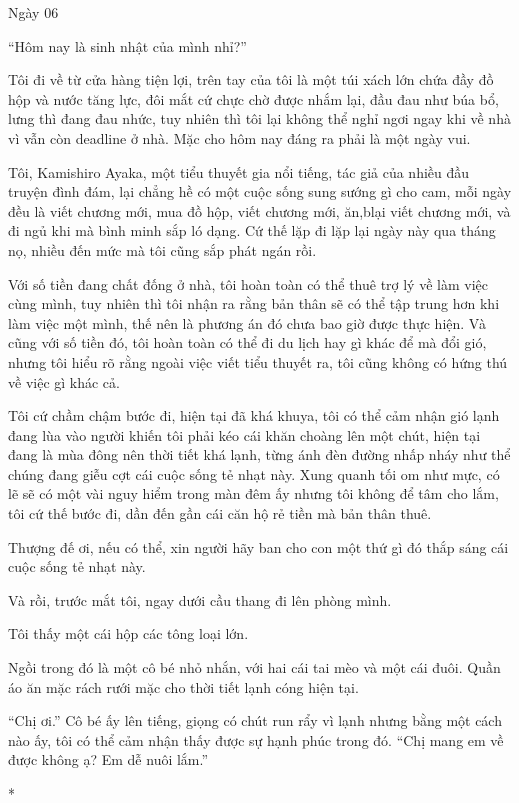 {Ngày 06}
{
``Hôm nay là sinh nhật của mình nhỉ?''

Tôi đi về từ cửa hàng tiện lợi, trên tay của tôi là một túi xách lớn
chứa đầy đồ hộp và nước tăng lực, đôi mắt cứ chực chờ được nhắm lại, đầu
đau như búa bổ, lưng thì đang đau nhức, tuy nhiên thì tôi lại không thể
nghỉ ngơi ngay khi về nhà vì vẫn còn deadline ở nhà. Mặc cho hôm nay
đáng ra phải là một ngày vui.

Tôi, Kamishiro Ayaka, một tiểu thuyết gia nổi tiếng, tác giả của nhiều
đầu truyện đình đám, lại chẳng hề có một cuộc sống sung sướng gì cho
cam, mỗi ngày đều là viết chương mới, mua đồ hộp, viết chương mới,
ăn,blại viết chương mới, và đi ngủ khi mà bình minh sắp ló dạng. Cứ thế
lặp đi lặp lại ngày này qua tháng nọ, nhiều đến mức mà tôi cũng sắp phát
ngán rồi.

Với số tiền đang chất đống ở nhà, tôi hoàn toàn có thể thuê trợ lý về
làm việc cùng mình, tuy nhiên thì tôi nhận ra rằng bản thân sẽ có thể
tập trung hơn khi làm việc một mình, thế nên là phương án đó chưa bao
giờ được thực hiện. Và cũng với số tiền đó, tôi hoàn toàn có thể đi du
lịch hay gì khác để mà đổi gió, nhưng tôi hiểu rõ rằng ngoài việc viết
tiểu thuyết ra, tôi cũng không có hứng thú về việc gì khác cả.

Tôi cứ chầm chậm bước đi, hiện tại đã khá khuya, tôi có thể cảm nhận gió
lạnh đang lùa vào người khiến tôi phải kéo cái khăn choàng lên một chút,
hiện tại đang là mùa đông nên thời tiết khá lạnh, từng ánh đèn đường
nhấp nháy như thể chúng đang giễu cợt cái cuộc sống tẻ nhạt này. Xung
quanh tối om như mực, có lẽ sẽ có một vài nguy hiểm trong màn đêm ấy
nhưng tôi không để tâm cho lắm, tôi cứ thế bước đi, dần đến gần cái căn
hộ rẻ tiền mà bản thân thuê.

Thượng đế ơi, nếu có thể, xin người hãy ban cho con một thứ gì đó thắp
sáng cái cuộc sống tẻ nhạt này.

Và rồi, trước mắt tôi, ngay dưới cầu thang đi lên phòng mình.

Tôi thấy một cái hộp các tông loại lớn.

Ngồi trong đó là một cô bé nhỏ nhắn, với hai cái tai mèo và một cái
đuôi. Quần áo ăn mặc rách rưới mặc cho thời tiết lạnh cóng hiện tại.

``Chị ơi.'' Cô bé ấy lên tiếng, giọng có chút run rẩy vì lạnh nhưng bằng
một cách nào ấy, tôi có thể cảm nhận thấy được sự hạnh phúc trong đó.
``Chị mang em về được không ạ? Em dễ nuôi lắm.''

*

}
